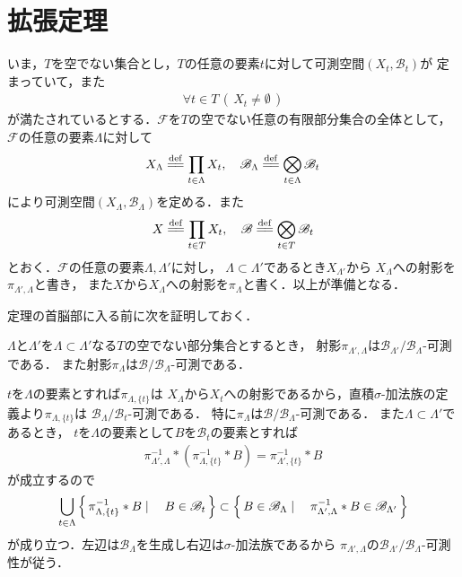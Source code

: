 \section{拡張定理}
	いま，$T$を空でない集合とし，$T$の任意の要素$t$に対して可測空間$(X_t,\mathscr{B}_t)$が
	定まっていて，また
	\begin{align}
		\forall t \in T\, (\, X_t \neq \emptyset\, )
	\end{align}
	が満たされているとする．$\mathscr{F}$を$T$の空でない任意の有限部分集合の全体として，$\mathscr{F}$の任意の要素$\Lambda$に対して
	\begin{align}
		X_\Lambda \defeq \prod_{t \in \Lambda} X_t,
		\quad \mathscr{B}_\Lambda \defeq \bigotimes_{t \in \Lambda} \mathscr{B}_t
	\end{align}
	により可測空間$(X_\Lambda,\mathscr{B}_\Lambda)$を定める．また
	\begin{align}
		X \defeq \prod_{t \in T} X_t,
		\quad \mathscr{B} \defeq \bigotimes_{t \in T} \mathscr{B}_t
	\end{align}
	とおく．$\mathscr{F}$の任意の要素$\Lambda,\Lambda'$に対し，
	$\Lambda \subset \Lambda'$であるとき$X_{\Lambda'}$から
	$X_{\Lambda}$への射影を$\pi_{\Lambda',\Lambda}$と書き，
	また$X$から$X_\Lambda$への射影を$\pi_{\Lambda}$と書く．以上が準備となる．
	
	定理の首脳部に入る前に次を証明しておく．
	\begin{screen}
		\begin{lem}[射影の可測性]\label{lem:Kolmogorov_extension_theorem}
			$\Lambda$と$\Lambda'$を$\Lambda \subset \Lambda'$なる$T$の空でない部分集合とするとき，
			射影$\pi_{\Lambda',\Lambda}$は$\mathscr{B}_{\Lambda'}/\mathscr{B}_\Lambda$-可測である．
			また射影$\pi_\Lambda$は$\mathscr{B}/\mathscr{B}_\Lambda$-可測である．
		\end{lem}
	\end{screen}
	
	\begin{prf}
		$t$を$\Lambda$の要素とすれば$\pi_{\Lambda,\{t\}}$は
		$X_\Lambda$から$X_t$への射影であるから，直積$\sigma$-加法族の定義より$\pi_{\Lambda,\{t\}}$は
		$\mathscr{B}_\Lambda/\mathscr{B}_t$-可測である．
		特に$\pi_\Lambda$は$\mathscr{B}/\mathscr{B}_\Lambda$-可測である．
		また$\Lambda \subset \Lambda'$であるとき，
		$t$を$\Lambda$の要素として$B$を$\mathscr{B}_t$の要素とすれば
		\begin{align}
			\pi_{\Lambda',\Lambda}^{-1} \ast \left(\pi_{\Lambda,\{t\}}^{-1} \ast B\right)
			= \pi_{\Lambda',\{t\}}^{-1} \ast B
		\end{align}
		が成立するので
		\begin{align}
			\bigcup_{t\in\Lambda} \left\{\, \pi_{\Lambda,\{t\}}^{-1} \ast B \mid \quad B \in \mathscr{B}_t\, \right\}
			\subset \left\{\, B \in \mathscr{B}_\Lambda \mid \quad \pi_{\Lambda',\Lambda}^{-1} \ast B \in \mathscr{B}_{\Lambda'}\, \right\}
		\end{align}
		が成り立つ．左辺は$\mathscr{B}_\Lambda$を生成し右辺は$\sigma$-加法族であるから
		$\pi_{\Lambda',\Lambda}$の$\mathscr{B}_{\Lambda'}/\mathscr{B}_\Lambda$-可測性が従う．
		\QED
	\end{prf}
	
